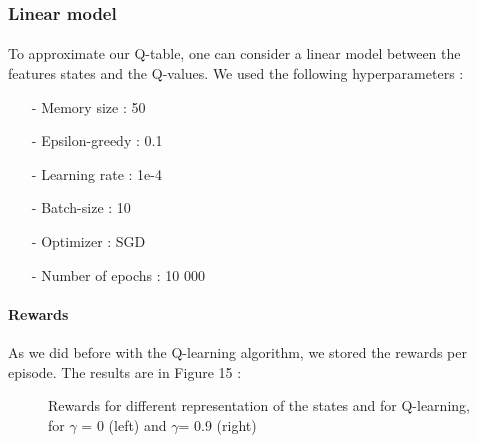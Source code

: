 \documentclass[a4paper]{article}
\begin{document}
    
    \subsubsection{Linear model}
    
        \paragraph{} To approximate our Q-table, one can consider a linear model between the features states and the Q-values.
        We used the following hyperparameters : 
        
        \begin{enumerate}
            \item[-] Memory size : 50
            \item[-] Epsilon-greedy : 0.1
            \item[-] Learning rate : 1e-4
            \item[-] Batch-size : 10
            \item[-] Optimizer : SGD
            \item[-] Number of epochs : 10 000
        \end{enumerate}
        
        \paragraph{Rewards} As we did before with the Q-learning algorithm, we stored the rewards per episode. The results are in Figure 15 : 
        
        \begin{figure}[h!]
        \centering
        \qquad
        \caption{Rewards for different representation of the states and for Q-learning, for $\gamma$ = 0 (left) and $\gamma $= 0.9 (right) }%
        \label{fig:example}%
        \end{figure}
\end{document}

